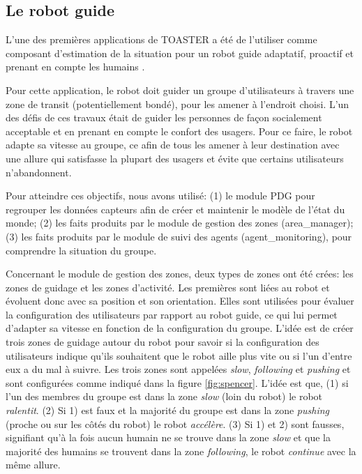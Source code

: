 \documentclass[a4paper,11pt,twoside]{StyleThese}
\begin{document}
\subsection{Le robot guide}

L'une des premières applications de TOASTER a été de l'utiliser comme composant d'estimation de la situation pour un robot guide adaptatif, proactif et prenant en compte les humains \cite{fioreicsr2015}.

Pour cette application, le robot doit guider un groupe d'utilisateurs à travers une zone de transit (potentiellement bondé), pour les amener à l'endroit choisi.
L'un des défis de ces travaux était de guider les personnes de façon socialement acceptable et en prenant en compte le confort des usagers.
Pour ce faire, le robot adapte sa vitesse au groupe, ce afin de tous les amener à leur destination avec une allure qui satisfasse la plupart des usagers et évite que certains utilisateurs n'abandonnent.

Pour atteindre ces objectifs, nous avons utilisé: (1) le module PDG pour regrouper les données capteurs afin de créer et maintenir le modèle de l'état du monde; (2) les faits produits par le module de gestion des zones (area\_manager); (3) les faits produits par le module de suivi des agents (agent\_monitoring), pour comprendre la situation du groupe. 

Concernant le module de gestion des zones, deux types de zones ont été crées: les zones de guidage et les zones d'activité. Les premières sont liées au robot et évoluent donc avec sa position et son orientation. Elles sont utilisées pour évaluer la configuration des utilisateurs par rapport au robot guide, ce qui lui permet d'adapter sa vitesse en fonction de la configuration du groupe.
L'idée est de créer trois zones de guidage autour du robot pour savoir si la configuration des utilisateurs indique qu'ils souhaitent que le robot aille plus vite ou si l'un d'entre eux a du mal à suivre.
Les trois zones sont appelées \textit{slow}, \textit{following} et \textit{pushing} et sont configurées comme indiqué dans la figure \ref{fig:spencer}.
L'idée est que, (1) si l'un des membres du groupe est dans la zone \textit{slow} (loin du robot) le robot \textit{ralentit}. (2) Si 1) est faux et la majorité du groupe est dans la zone \textit{pushing} (proche ou sur les côtés du robot) le robot \textit{accélère}. (3) Si 1) et 2) sont fausses, signifiant qu'à la fois aucun humain ne se trouve dans la zone \textit{slow} et que la majorité des humains se trouvent dans la zone \textit{following}, le robot \textit{continue} avec la même allure.
\end{document}
